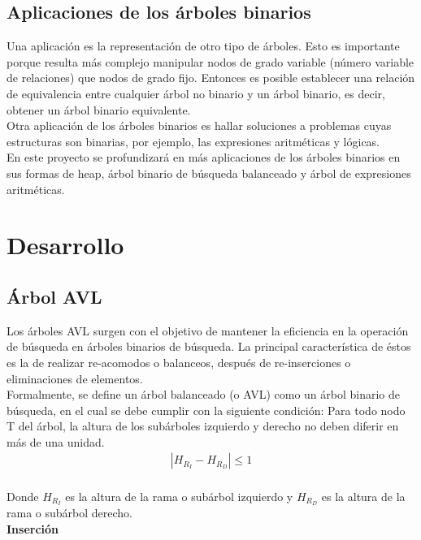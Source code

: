 \documentclass{article}
\begin{document}
\subsection{Aplicaciones de los árboles binarios}
Una aplicación es la representación de otro tipo de árboles. Esto es importante porque resulta más complejo manipular nodos de grado variable (número variable de relaciones) que nodos de grado fijo. Entonces es posible establecer una relación de equivalencia entre cualquier árbol no binario y un árbol binario, es decir, obtener un árbol binario equivalente.\\

Otra aplicación de los árboles binarios es hallar soluciones a problemas cuyas estructuras son binarias, por ejemplo, las expresiones aritméticas y lógicas.\\

En este proyecto se profundizará en más aplicaciones de los árboles binarios en sus formas de heap, árbol binario de búsqueda balanceado y árbol de expresiones aritméticas.
\newpage
\section{Desarrollo}
\subsection{Árbol AVL}
Los árboles AVL surgen con el objetivo de mantener la eficiencia en la operación de búsqueda en árboles binarios de búsqueda. La principal característica de éstos es la de realizar re-acomodos o balanceos, después de re-inserciones o eliminaciones de elementos.\\

Formalmente, se define un árbol balanceado (o AVL) como un árbol binario de búsqueda, en el cual se debe cumplir con la siguiente condición: Para todo nodo T del árbol, la altura de los subárboles izquierdo y derecho no deben diferir en más de una unidad.\\
\begin{align*}
|H_{R_I} - H_{R_D}|\leq1\\
\end{align*}

Donde $H_{R_I}$ es la altura de la rama o subárbol izquierdo y $H_{R_D}$ es la altura de la rama o subárbol derecho.\\

\textbf{Inserción}\\
\end{document}
